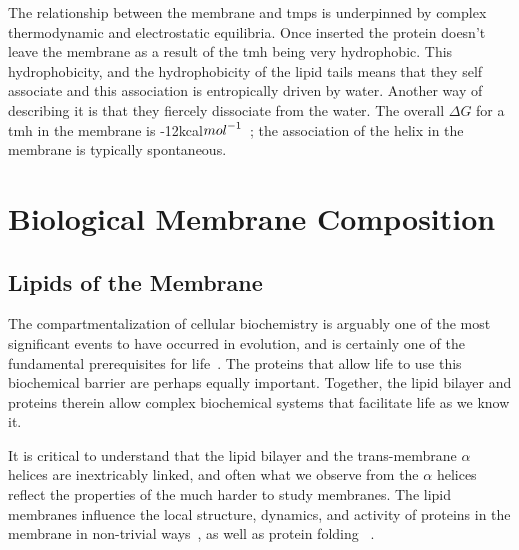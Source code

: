 The relationship between the membrane and \gls{tmp}s is underpinned by complex thermodynamic and electrostatic equilibria. Once inserted the protein doesn't leave the membrane as a result of the \gls{tmh} being very hydrophobic. This hydrophobicity, and the hydrophobicity of the lipid tails means that they self associate and this association is entropically driven by water. Another way of describing it is that they fiercely dissociate from the water. The overall $\Delta G$ for a \gls{tmh} in the membrane is -12kcal${mol}^{\--1}$~\cite{Cymer2014}; the association of the helix in the membrane is typically spontaneous.

\section{Biological Membrane Composition}

\subsection{Lipids of the Membrane}

The compartmentalization of cellular biochemistry is arguably one of the most significant events to have occurred in evolution, and is certainly one of the fundamental prerequisites for life~\cite{Koshland2002}.  The proteins that allow life to use this biochemical barrier are perhaps equally important. Together, the lipid bilayer and proteins therein allow complex biochemical systems that facilitate life as we know it.

It is critical to understand that the lipid bilayer and the trans-membrane $\alpha$ helices are inextricably linked, and often what we observe from the $\alpha$ helices reflect the properties of the much harder to study membranes. The lipid membranes influence the local structure, dynamics, and activity of proteins in the membrane in non-trivial ways~\cite{Bondar2010, Bondar2009, Jardon-Valadez2010, Kalvodova2005, Urban2005, White2001, Jensen2004, Henin2014}, as well as protein folding ~\cite{Kauko2010}. %

